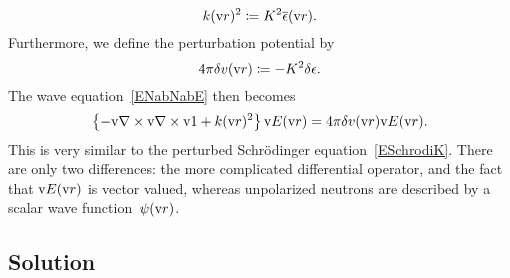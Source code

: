 \begin{equation}
  k(\text{v}{r})^2 \coloneqq K^2 \overline{\epsilon}(\text{v}{r}).
\end{equation}
Furthermore, we define the perturbation potential by
%
\begin{equation}
  4\pi\delta v(\text{v}{r}) \coloneqq - K^2\delta\epsilon.
\end{equation}
The wave equation~\cref{ENabNabE} then becomes
\begin{equation}\label{EwaveE3}
  \left\{-\text{v}{\nabla}\times\text{v}{\nabla}\times\text{v}{1} + k(\text{v}{r})^2\right\}\text{v}{E}(\text{v}{r})
  = 4\pi\delta v(\text{v}{r})\text{v}{E}(\text{v}{r}).
\end{equation}
%
%
This is very similar to the perturbed Schrödinger equation~\cref{ESchrodiK}.
%
There are only two differences:
the more complicated differential operator,
and the fact that $\text{v}{E}(\text{v}{r})$ is vector valued,
whereas unpolarized neutrons are described by a scalar wave function~$\psi(\text{v}{r})$.

\subsection{Solution}\label{SXscasol}

\MissingSection

\iffalse
OLD MAT:
To simplify the left-hand side,
we make use of a standard vector analysis identity,
followed by an application of Gauss's law $\Nabla\v{D}=0$:
\index{Gauss's law}%
\begin{equation}
  \Nabla\times\Nabla\times\v{E}
  = - \Nabla^2\v{E} + \Nabla(\Nabla\v{E})
  = - \Nabla^2\v{E} - \Nabla\left[\eps(\r)^{-1}(\Nabla\v\eps(\r))\v{E}\right].
\end{equation}
When applied to propagating waves, the second term can be neglected against the first one.
This follows from a simple estimate:
For X-rays, the dielectric permittivity~$\eps$
\index{Dielectric permittivity}%
\index{Permittivity}%
deviates from the unit tensor by no more than $10^{-5}$.
All the more certainly, fluctuation amplitudes are no larger than $10^{-5}$.
In contrast, within half a wavelength, $\v{E}$ changes sign.
Therefore, $(\Nabla\eps)\v{E}$ is by at least five orders of magnitude
smaller than $\Nabla\v{E}$,
and can safely be neglected.
With this approximation, the wave equation~\cref{ENabNabE} becomes simply
\begin{equation}\label{EwaveE2}
  \Nabla^2\v{E}
  = -K^2\eps(\r)\v{E}.
\end{equation}
\fi

